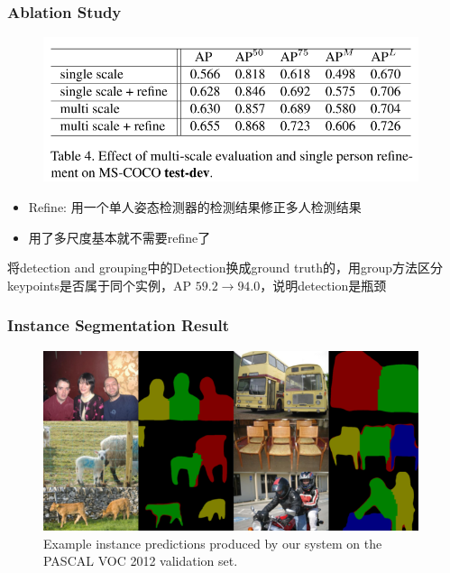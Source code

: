 \documentclass{ctexbeamer}
\begin{document}
  \begin{frame}
    \frametitle{Ablation Study}
    \begin{figure}
      \includegraphics[width=11cm]{fig/table4.png}
      \end{figure}
      \begin{itemize}
        \item Refine: 用一个单人姿态检测器的检测结果修正多人检测结果
        \item 用了多尺度基本就不需要refine了
      \end{itemize}
     \begin{block}{将detection and grouping中的Detection换成ground truth的，用group方法区分keypoints是否属于同个实例，AP $59.2 \rightarrow 94.0$，说明detection是瓶颈}
     \end{block}
    \vskip 1cm
  \end{frame}

  \begin{frame}
    \frametitle{Instance Segmentation Result}
    \begin{figure}
      \includegraphics[width=11cm]{fig/inst-exs.png}
      \caption{\label{fig:seg_result}Example instance predictions produced by our system on the PASCAL VOC 2012 validation set.}
      \end{figure}
    \vskip 1cm
  \end{frame}
\end{document}
